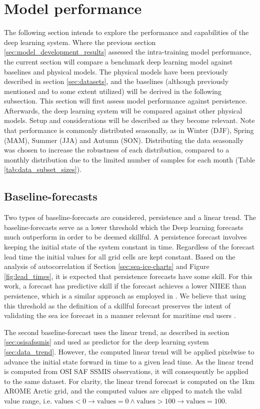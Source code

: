 \documentclass[../main/thesis.tex]{subfiles}
\begin{document}
\section{Model performance}
\label{sec:model-perf}
The following section intends to explore the performance and capabilities of the deep learning system. Where the previous section \ref{sec:model_development_results} assessed the intra-training model performance, the current section will compare a benchmark deep learning model against baselines and physical models. The physical models have been previously described in section \ref{sec:datasets}, and the baselines (although previously mentioned and to some extent utilized) will be derived in the following subsection. This section will first assess model performance against persistence. Afterwards, the deep learning system will be compared against other physical models. Setup and considerations will be described as they become relevant. Note that performance is commonly distributed seasonally, as in Winter (DJF), Spring (MAM), Summer (JJA) and Autumn (SON). Distributing the data seasonally was chosen to increase the robustness of each distribution, compared to a monthly distribution due to the limited number of samples for each month (Table \ref{tab:data_subset_sizes}).

\subsection{Baseline-forecasts}
\label{sec:baselines}
Two types of baseline-forecasts are considered, persistence and a linear trend. The baseline-forecasts serve as a lower threshold which the Deep learning forecasts much outperform in order to be deemed skillful. A persistence forecast involves keeping the initial state of the system constant in time. Regardless of the forecast lead time the initial values for all grid cells are kept constant. Based on the analysis of autocorrelation if Section \ref{sec:sea-ice-charts} and Figure \ref{fig:lead_times}, it is expected that persistence forecasts have some skill. For this work, a forecast has predictive skill if the forecast achieves a lower NIIEE than persistence, which is a similar approach as employed in \citet{Zampieri2019}. We believe that using this threshold as the definition of a skillful forecast preserves the intent of validating the sea ice forecast in a manner relevant for maritime end users \citep{Melsom2019, Veland2021}.

The second baseline-forecast uses the linear trend, as described in section \ref{sec:osisafssmis} and used as predictor for the deep learning system \ref{sec:data_trend}. However, the computed linear trend will be applied pixelwise to advance the initial state forward in time to a given lead time. As the linear trend is computed from OSI SAF SSMIS observations, it will consequently be applied to the same dataset. For clarity, the linear trend forecast is computed on the 1km AROME Arctic grid, and the computed values are clipped to match the valid value range, i.e. $\text{values} < 0 \rightarrow \text{values} = 0 \land \text{values} > 100 \rightarrow \text{values} = 100$.
\end{document}
